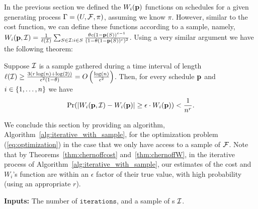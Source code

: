 In the previous section we defined the $W_i(\mathbf{p})$ functions on schedules for a given generating process $\Gamma=(U,\mathcal{F},\pi)$, assuming we know $\pi$. However, similar to the cost function, we can define these functions according to a sample, namely, 
$W_i(\mathbf{p},\mathcal{I}) = \frac{1}{\ell(\mathcal{I})}\sum_{S\in \mathcal{I}: i\in S} \frac{\theta c (1-\mathbf{p}(S))^{c-1}}{(1-\theta(1-\mathbf{p}(S))^c)^2}$.
Using a very similar argument we have the following theorem:
\begin{theorem}\label{thm:chernoffW}
 Suppose $\mathcal{I}$ is a sample gathered during a time interval of length $\ell(\mathcal{I}) \geq \frac{3(r\log(n)+\log(2))}{\epsilon^2(1-\theta)} = O\left(\frac{\log(n)}{\epsilon^2}\right)$. Then, for every schedule $\mathbf{p}$ and $i\in\left\{1,\dots,n\right\}$ we have
 $$\Pr(|W_i(\mathbf{p},\mathcal{I}) - W_i(\mathbf{p})|\geq \epsilon\cdot W_i(\mathbf{p})) < \frac{1}{n^r}.$$
\end{theorem}

We conclude this section by providing an algorithm, Algorithm~\ref{alg:iterative_with_sample}, for the optimization problem (\ref{eq:optimization}) in the case that we only have access to a sample of $\mathcal{F}$. Note that by Theorems~\ref{thm:chernoffcost} and~\ref{thm:chernoffW}, in the iterative process of Algorithm~\ref{alg:iterative_with_sample}, our estimates of the cost and $W_i$'s function are within an $\epsilon$ factor of their true value, with high probability (using an appropriate $r$).

\begin{algorithm}[!h]
\BlankLine
{\bf Inputs:} The number of  $\texttt{iterations}$, and a sample of {\ins}s $\mathcal{I}$.

\caption{$\appoptimizer(\texttt{iterations},\Sample)$}\label{alg:iterative_with_sample}
\end{algorithm}  









